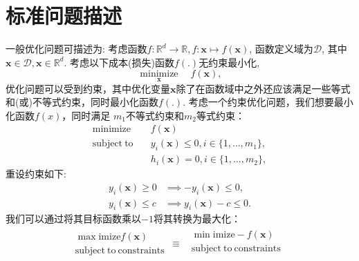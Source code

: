 \documentclass[lang=cn,10pt]{gorgeousnbook}
\numberwithin{equation}{section}%
\numberwithin{figure}{section}%
\begin{document}
\section{标准问题描述}
一般优化问题可描述为: 考虑函数$f:\mathbb{R}^d\to\mathbb{R},f:\boldsymbol{x}\mapsto f(\boldsymbol{x})$, 函数定义域为$\mathcal{D}$, 其中$\boldsymbol{x}\in\mathcal{D},\boldsymbol{x}\in\mathbb{R}^d$.
考虑以下成本(损失)函数$f(.)$无约束最小化,
\begin{equation}
	\underset{\boldsymbol{x}}{\operatorname*{minimize}}\quad f(\boldsymbol{x}),
\end{equation}
优化问题可以受到约束，其中优化变量$\boldsymbol{x}$除了在函数域中之外还应该满足一些等式和(或)不等式约束，同时最小化函数$f(.)$. 考虑一个约束优化问题，我们想要最小化函数$f(x)$，同时满足 $m_1 $不等式约束和$ m_2 $等式约束：
\begin{equation}
	\begin{aligned}\mathrm{minimize}\quad&f(\boldsymbol{x})\\\mathrm{subject~to}\quad&y_i(\boldsymbol{x})\leq0,i\in\{1,\ldots,m_1\},\\&h_i(\boldsymbol{x})=0,i\in\{1,\ldots,m_2\},\end{aligned}\label{equation_optimization_problem}
\end{equation}
重设约束如下:
\begin{equation}
	\begin{aligned}y_i(\boldsymbol{x})\geq0&\implies-y_i(\boldsymbol{x})\leq0,\\y_i(\boldsymbol{x})\leq c&\implies y_i(\boldsymbol{x})-c\leq0.\end{aligned}
\end{equation}
我们可以通过将其目标函数乘以$-1$将其转换为最大化：
\begin{equation}
	\begin{array}{c}
		\max\mathrm{imize} f\left( \boldsymbol{x} \right)\\
		\mathrm{subject}\ \mathrm{to}\ \mathrm{constraints}\\
	\end{array}\begin{matrix}
		\equiv&		\begin{array}{c}
		\min\mathrm{imize} -f\left( \boldsymbol{x} \right)\\
		\mathrm{subject}\  \mathrm{to}\ \mathrm{constraints}\\
	\end{array}\\
	\end{matrix}\label{4.1.4}
\end{equation}
\end{document}
